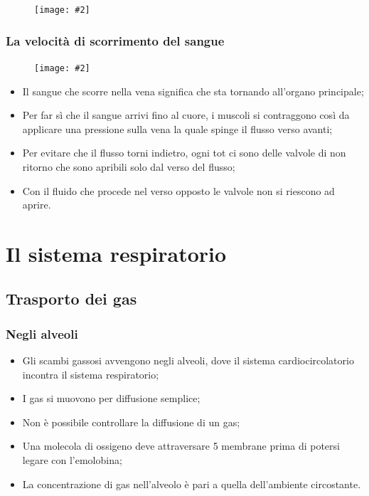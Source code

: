 \documentclass{article}
\newcommand{\cfig}[2]{
    \phantom{}
    \begin{figure}[ht!]
        \begin{center}
            \texttt{[image: \#2]}
        \end{center}
    \end{figure}
}
\begin{document}
\cfig{.9}{media/sfigmomanometro.png}

\newpage
\subsubsection{La velocità di scorrimento del sangue}

\cfig{1}{media/velocita-sangue.png}

\begin{itemize}
    \item Il sangue che scorre nella vena significa che sta tornando all’organo principale;
    \item Per far sì che il sangue arrivi fino al cuore, i muscoli si contraggono così da
        applicare una pressione sulla vena la quale spinge il flusso verso avanti;
    \item Per evitare che il flusso torni indietro, ogni tot ci sono delle valvole di non
        ritorno che sono apribili solo dal verso del flusso;
    \item Con il fluido che procede nel verso opposto le valvole non si riescono ad aprire.
\end{itemize}

\newpage
\section{Il sistema respiratorio}
\subsection{Trasporto dei gas}
\subsubsection{Negli alveoli}
\begin{itemize}
    \item Gli scambi gassosi avvengono negli alveoli, dove il sistema cardiocircolatorio
        incontra il sistema respiratorio;
    \item I gas si muovono per diffusione semplice;
    \item Non è possibile controllare la diffusione di un gas;
    \item Una molecola di ossigeno deve attraversare 5 membrane prima di potersi legare con
        l'emolobina;
    \item La concentrazione di gas nell'alveolo è pari a quella dell'ambiente circostante.
\end{itemize}
\end{document}
